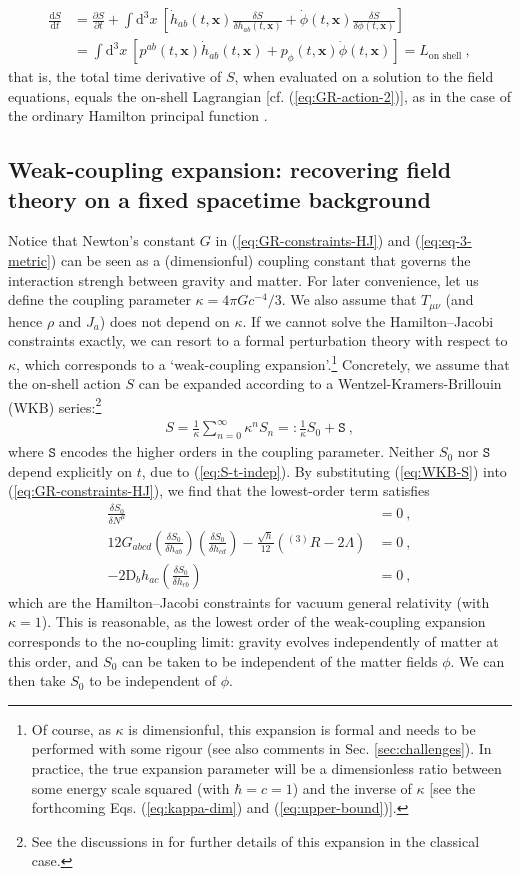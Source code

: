 \documentclass[12pt]{iopart}
\def\eq#1{\begin{equation}\begin{aligned}#1\end{aligned}\end{equation}}
\def\eref#1{(\ref{eq:#1})}
\def\D{\mathrm{d}}
\def\del#1#2{\frac{\partial#1}{\partial#2}}
\def\Del#1#2{\frac{\D#1}{\D#2}}
\def\S{\mathtt{S}}
\def\x{\mathbf{x}}
\begin{document}
\eq{\label{eq:on-shell-total}
\Del{S}{t} &= \del{S}{t}+\int\D^3x\ \left[\dot{h}_{ab}(t,\x)\frac{\delta S}{\delta h_{ab}(t,\x)} +\dot{\phi}(t,\x)\frac{\delta S}{\delta\phi(t,\x)}\right]\\
&= \int\D^3x\ \left[p^{ab}(t,\x)\dot{h}_{ab}(t,\x) +p_{\phi}(t,\x)\dot{\phi}(t,\x)\right] = L_{\text{on shell}} \ ,
}
that is, the total time derivative of $S$, when evaluated on a solution to the field equations, equals the on-shell Lagrangian [cf. \eref{GR-action-2}], as in the case of the ordinary Hamilton principal function \citep{Lanczos:book}.

\subsection{\label{sec:weak}Weak-coupling expansion: recovering field theory on a fixed spacetime background}
Notice that Newton's constant $G$ in \eref{GR-constraints-HJ} and \eref{eq-3-metric} can be seen as a (dimensionful) coupling constant that governs the interaction strengh between gravity and matter. For later convenience, let us define the coupling parameter $\kappa =4\pi G c^{-4}/3$. We also assume that $T_{\mu\nu}$ (and hence $\rho$ and $J_a$) does not depend on $\kappa$. If we cannot solve the Hamilton--Jacobi constraints exactly, we can resort to a formal perturbation theory with respect to $\kappa$, which corresponds to a `weak-coupling expansion'.\footnote{Of course, as $\kappa$ is dimensionful, this expansion is formal and needs to be performed with some rigour (see also comments in Sec. \ref{sec:challenges}). In practice, the true expansion parameter will be a dimensionless ratio between some energy scale squared (with $\hbar=c=1$) and the inverse of $\kappa$ [see the forthcoming Eqs. \eref{kappa-dim} and \eref{upper-bound}].} Concretely, we assume that the on-shell action $S$ can be expanded according to a Wentzel-Kramers-Brillouin (WKB) series:\footnote{See the discussions in \citet{Parentani:1998tv,Chataignier:2019psm,Chataignier:2022iwb,Chataig:Thesis,Chataignier:2020fap} for further details of this expansion in the classical case.}
\eq{\label{eq:WKB-S}
S = \frac{1}{\kappa}\sum_{n=0}^{\infty}\kappa^n S_n =: \frac{1}{\kappa}S_0+\S \ ,
}
where $\S$ encodes the higher orders in the coupling parameter. Neither $S_0$ nor $\S$ depend explicitly on $t$, due to \eref{S-t-indep}. By substituting \eref{WKB-S} into \eref{GR-constraints-HJ}, we find that the lowest-order term satisfies
\eq{\label{eq:vacuum-HJ}
\frac{\delta S_0}{\delta N^{\mu}} &=0 \ , \\
12 G_{abcd}\left(\frac{\delta S_0}{\delta h_{ab}}\right)\left(\frac{\delta S_0}{\delta h_{cd}}\right)-\frac{\sqrt{h}}{12}\left(^{(3)}R-2\Lambda\right) &= 0 \ ,\\
-2\mathrm{D}_b h_{ac}\left(\frac{\delta S_0}{\delta h_{cb}}\right) &=0 \ ,
}
which are the Hamilton--Jacobi constraints for vacuum general relativity (with $\kappa=1$). This is reasonable, as the lowest order of the weak-coupling expansion corresponds to the no-coupling limit: gravity evolves independently of matter at this order, and $S_0$ can be taken to be independent of the matter fields $\phi$. We can then take $S_0$ to be independent of $\phi$.
\end{document}
